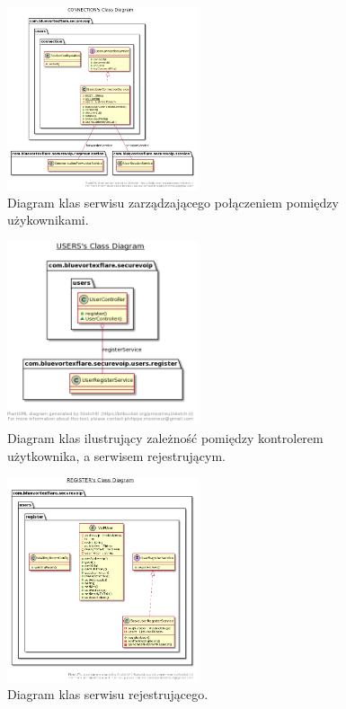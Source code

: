 \begin{figure}[H]
	\includegraphics[width=0.5\textwidth]{images/uml/s4.png}
	\centering	
	\caption{\centering Diagram klas serwisu zarządzającego połączeniem pomiędzy użykownikami.}
\end{figure}
\begin{figure}[H]
	\includegraphics[width=0.5\textwidth]{images/uml/s5.png}
	\centering	
	\caption{\centering Diagram klas ilustrujący zależność pomiędzy kontrolerem użytkownika, a serwisem rejestrującym.}
\end{figure}
\begin{figure}[H]
	\includegraphics[width=0.5\textwidth]{images/uml/s6.png}
	\centering	
	\caption{\centering Diagram klas serwisu rejestrującego.}
\end{figure}